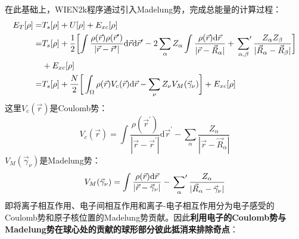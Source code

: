 在此基础上，\textrm{WIEN2k}程序通过引入\textrm{Madelung}势，完成总能量的计算过程\cite{JMP22-2433_1981}：
\begin{equation}
	\begin{aligned}
	E_T[\rho]=&T_s[\rho]+U[\rho]+E_{xc}[\rho]\\
	=&T_s[\rho]+\dfrac12\biggl[\int\dfrac{\rho(\vec r)\rho(\vec r^{\prime}){}}{|\vec r-\vec r^{\prime}|}\mathrm{d}\vec r\mathrm{d}\vec r^{\prime}-2\sum_{\alpha}Z_{\alpha}\int\dfrac{\rho(\vec r)\mathrm{d}\vec r}{|\vec r-\vec R_{\alpha}|}+\sideset{}{^\prime}\sum_{\alpha,\beta}\dfrac{Z_{\alpha}Z_{\beta}}{|\vec R_{\alpha}-\vec R_{\beta}|}\biggr]\\
	&+E_{xc}[\rho]\\
	=&T_s[\rho]+\dfrac{N}2\bigg[\int_{\Omega}\rho(\vec r)V_c(\vec r)\mathrm{d}\vec r-\sum_{\nu}Z_{\nu}V_M(\vec\gamma_{\nu})\biggr]+E_{xc}[\rho]
	\end{aligned}
	\label{eq_E_total}
\end{equation}
这里$V_c(\vec r)$是\textrm{Coulomb}势：
\begin{equation}
	V_c(\vec r)=\int\dfrac{\rho(\vec r^{\prime})}{|\vec r-\vec r^{\prime}|}\mathrm{d}\vec r^{\prime}-\sum_{\alpha}\dfrac{Z_{\alpha}}{|\vec r-\vec R_{\alpha}|}
	\label{eq_Vcou_WIEN}
\end{equation}
$V_M(\vec\gamma_{\nu})$是\textrm{Madelung}势：
\begin{equation}
	V_M(\vec\gamma_{\nu})=\int\dfrac{\rho(\vec r)\mathrm{d}\vec r}{|\vec r-\vec\gamma_{\nu}|}-\sideset{}{^\prime}\sum_{\alpha}\dfrac{Z_{\alpha}}{|\vec R_{\alpha}-\vec\gamma_{\nu}|}
	\label{eq_Vmadelung}
\end{equation}
即将离子相互作用、电子间相互作用和离子-电子相互作用分为电子感受的\textrm{Coulomb}势和原子核位置的\textrm{Madelung}势贡献。因此\textbf{利用电子的\textrm{Coulomb}势与\textrm{Madelung}势在球心处的贡献的球形部分彼此抵消来排除奇点}：

